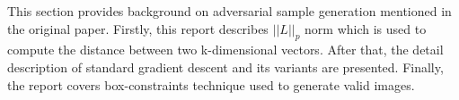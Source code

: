 \documentclass[12pt]{article}
\newtheorem{definition}{Definition}
\DeclareMathOperator*{\argmax}{argmax}
\begin{document}
This section provides background on adversarial sample generation mentioned in the original paper. Firstly, this report describes $||L||_p$ norm which is used to compute the distance between two k-dimensional vectors. After that, the detail description of standard gradient descent and its variants are presented. Finally, the report covers box-constraints technique used to generate valid images.

%
%
%
%
%
%
\end{document}
